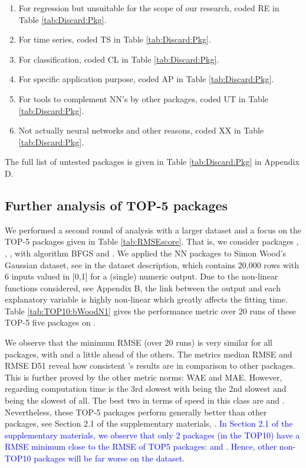 \begin{enumerate}
\def\labelenumi{\arabic{enumi}.}
\tightlist
\item
  For regression but unsuitable for the scope of our research, coded RE
  in Table \ref{tab:Discard:Pkg}.
\item
  For time series, coded TS in Table \ref{tab:Discard:Pkg}.
\item
  For classification, coded CL in Table \ref{tab:Discard:Pkg}.
\item
  For specific application purpose, coded AP in Table
  \ref{tab:Discard:Pkg}.
\item
  For tools to complement NN's by other packages, coded UT in Table
  \ref{tab:Discard:Pkg}.
\item
  Not actually neural networks and other reasons, coded XX in Table
  \ref{tab:Discard:Pkg}.
\end{enumerate}

The full list of untested packages is given in Table
\ref{tab:Discard:Pkg} in Appendix D.

\hypertarget{further-analysis-of-top-5-packages}{%
\subsection{Further analysis of TOP-5
packages}\label{further-analysis-of-top-5-packages}}

We performed a second round of analysis with a larger dataset and a
focus on the TOP-5 packages given in Table \ref{tab:RMSEscore}. That is,
we consider packages , , ,
 with algorithm BFGS and . We applied the
NN packages to Simon Wood's Gaussian dataset, see  in the
dataset description, which contains 20,000 rows with 6 inputs valued in
{[}0,1{]} for a (single) numeric output. Due to the non-linear functions
considered, see Appendix B, the link between the output and each
explanatory variable is highly non-linear which greatly affects the
fitting time. Table \ref{tab:TOP10:bWoodN1} gives the performance metric
over 20 runs of these TOP-5 five packages on .

We observe that the minimum RMSE (over 20 runs) is very similar for all
packages, with  and  a little ahead of the
others. The metrics median RMSE and RMSE D51 reveal how consistent
's results are in comparison to other packages. This is
further proved by the other metric norms: WAE and MAE. However,
regarding computation time  is the 3rd slowest with
 being the 2nd slowest and  being the slowest of
all. The best two in terms of speed in this class are  and
. Nevertheless, these TOP-5 packages perform generally
better than other packages, see Section 2.1 of the supplementary
materials, \citep{suppl:material:paper21}.
\textcolor{blue}{In Section 2.1 of the supplementary materials, we observe that only 
2 packages (in the TOP10) have a RMSE minimum close to the RMSE of TOP5 packages: 
and . Hence, other non-TOP10 packages will be far worse
on the  dataset.}

